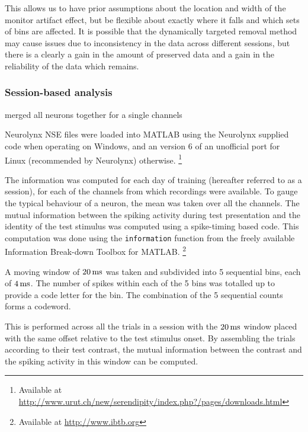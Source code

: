 This allows us to have prior assumptions about the location and width of the monitor artifact effect, but be flexible about exactly where it falls and which sets of bins are affected.
It is possible that the dynamically targeted removal method may cause issues due to inconsistency in the data across different sessions, but there is a clearly a gain in the amount of preserved data and a gain in the reliability of the data which remains.

\FloatBarrier
\subsubsection{Session-based analysis}

merged all neurons together for a single channels

Neurolynx NSE files were loaded into MATLAB using the Neurolynx supplied code when operating on Windows, and an version 6 of an unofficial port for Linux (recommended by Neurolynx) otherwise.%
\footnote{Available at
\\ \url{http://www.urut.ch/new/serendipity/index.php?/pages/downloads.html}}

The information was computed for each day of training (hereafter referred to as a session), for each of the channels from which recordings were available. To gauge the typical behaviour of a neuron, the mean was taken over all the channels.
The mutual information between the spiking activity during test presentation and the identity of the test stimulus was computed
using a spike-timing based code.
This computation was done using the \verb|information| function from the freely available Information Break-down Toolbox \cite{Magri2009} for MATLAB.%
\footnote{Available at \url{http://www.ibtb.org}}

A moving window of $\unit[20]{ms}$ was taken and subdivided into 5 sequential bins, each of $\unit[4]{ms}$.
The number of spikes within each of the 5 bins was totalled up to provide a code letter for the bin.
The combination of the 5 sequential counts forms a codeword.

This is performed across all the trials in a session with the $\unit[20]{ms}$ window placed with the same offset relative to the test stimulus onset.
By assembling the trials according to their test contrast, the mutual information between the contrast and the spiking activity in this window can be computed.

